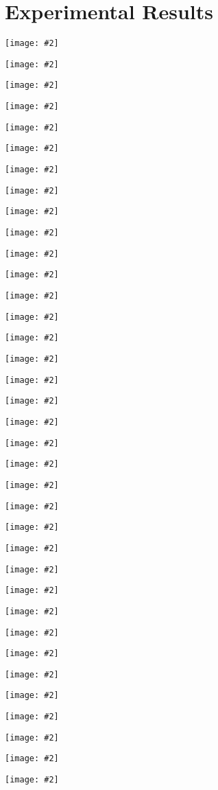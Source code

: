 \documentclass[10pt,twocolumn,letterpaper]{article}
\def\etal{et~al.\_}			  \def\eg{e.g.,~}               \def\ie{i.e.,~}               \def\etc{etc}                 \def\cf{cf.~}                 \def\viz{viz.~}               \def\vs{vs.~}
\newcommand{\mpage}[2]
{
\begin{minipage}{#1\linewidth}\centering
#2
\end{minipage}
}
\newcommand{\mfigure}[2]
{
\begin{minipage}{#1\linewidth}\centering
\texttt{[image: \#2]}
\end{minipage}
}
\begin{document}
\section{Experimental Results}
\label{sec:results}
\begin{figure*}[hbtp]
\centering

\mpage{0.01}{} 
\mfigure{0.09}{{bags_results/guide/GT/29_6.png}}\hfill
\mfigure{0.09}{{bags_results/guide/GT/43_3.png}}\hfill
\mfigure{0.09}{{bags_results/guide/GT/98_1.png}}\hfill
\mfigure{0.07}{{shoes_results/guide/0_7.png}}\hfill
\mfigure{0.07}{{shoes_results/guide/3_0.png}}\hfill
\mfigure{0.07}{{shoes_results/guide/37_9.png}}\hfill
\mfigure{0.07}{{clothes_results/guide/0_0.png}}\hfill
\mfigure{0.07}{{clothes_results/guide/2_0.png}}\hfill
\mfigure{0.07}{{clothes_results/guide/3_0.png}}\hfill


\mpage{0.01}{} 
\mfigure{0.09}{{bags_results/pix2pix/GT/29_6.png}}\hfill
\mfigure{0.09}{{bags_results/pix2pix/GT/43_3.png}}\hfill
\mfigure{0.09}{{bags_results/pix2pix/GT/98_1.png}}\hfill
\mfigure{0.07}{{shoes_results/pix2pix/0_7.png}}\hfill
\mfigure{0.07}{{shoes_results/pix2pix/3_0.png}}\hfill
\mfigure{0.07}{{shoes_results/pix2pix/37_9.png}}\hfill
\mfigure{0.07}{{clothes_results/pix2pix/0_0.png}}\hfill
\mfigure{0.07}{{clothes_results/pix2pix/2_0.png}}\hfill
\mfigure{0.07}{{clothes_results/pix2pix/3_0.png}}\hfill


\mpage{0.01}{\raisebox{0pt}{\rotatebox{90}{Xian \etal}}} 
\mfigure{0.09}{{bags_results/textureGAN/GT/29_6.png}}\hfill
\mfigure{0.09}{{bags_results/textureGAN/GT/43_3.png}}\hfill
\mfigure{0.09}{{bags_results/textureGAN/GT/98_1.png}}\hfill
\mfigure{0.07}{{shoes_results/textureGAN/0_7.png}}\hfill
\mfigure{0.07}{{shoes_results/textureGAN/3_0.png}}\hfill
\mfigure{0.07}{{shoes_results/textureGAN/37_9.png}}\hfill
\mfigure{0.07}{{clothes_results/textureGAN/0_0.png}}\hfill
\mfigure{0.07}{{clothes_results/textureGAN/2_0.png}}\hfill
\mfigure{0.07}{{clothes_results/textureGAN/3_0.png}}\hfill


\mpage{0.01}{} 
\mfigure{0.09}{{bags_results/ours/GT/29_6.png}}\hfill
\mfigure{0.09}{{bags_results/ours/GT/43_3.png}}\hfill
\mfigure{0.09}{{bags_results/ours/GT/98_1.png}}\hfill
\mfigure{0.07}{{shoes_results/ours/0_7.png}}\hfill
\mfigure{0.07}{{shoes_results/ours/3_0.png}}\hfill
\mfigure{0.07}{{shoes_results/ours/37_9.png}}\hfill
\mfigure{0.07}{{clothes_results/ours/0_0.png}}\hfill
\mfigure{0.07}{{clothes_results/ours/2_0.png}}\hfill
\mfigure{0.07}{{clothes_results/ours/3_0.png}}\hfill



\end{figure*}
\end{document}
